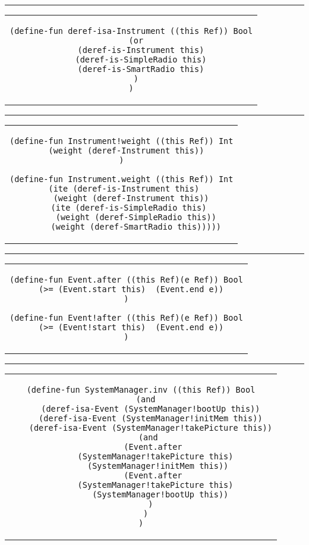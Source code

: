 \rule{\textwidth}{0.2pt}

\begin{center}
\begin{tabular}{c}
\begin{lstlisting}
(define-fun deref-isa-Instrument ((this Ref)) Bool
  (or
    (deref-is-Instrument this)
    (deref-is-SimpleRadio this)
    (deref-is-SmartRadio this)
  )
)
\end{lstlisting}
\end{tabular}
\end{center}

\rule{\textwidth}{0.2pt}

\begin{center}
\begin{tabular}{c}
\begin{lstlisting}
(define-fun Instrument!weight ((this Ref)) Int
  (weight (deref-Instrument this))
)

(define-fun Instrument.weight ((this Ref)) Int
  (ite (deref-is-Instrument this) 
    (weight (deref-Instrument this))
    (ite (deref-is-SimpleRadio this) 
      (weight (deref-SimpleRadio this))
      (weight (deref-SmartRadio this)))))
\end{lstlisting}
\end{tabular}
\end{center}

\rule{\textwidth}{0.2pt}

\begin{center}
\begin{tabular}{c}
\begin{lstlisting}
(define-fun Event.after ((this Ref)(e Ref)) Bool
  (>= (Event.start this)  (Event.end e))
)

(define-fun Event!after ((this Ref)(e Ref)) Bool
  (>= (Event!start this)  (Event.end e))
)
\end{lstlisting}
\end{tabular}
\end{center}

\rule{\textwidth}{0.2pt}

\begin{center}
\begin{tabular}{c}
\begin{lstlisting}
(define-fun SystemManager.inv ((this Ref)) Bool
  (and
    (deref-isa-Event (SystemManager!bootUp this))
    (deref-isa-Event (SystemManager!initMem this))
    (deref-isa-Event (SystemManager!takePicture this))
    (and 
      (Event.after 
        (SystemManager!takePicture this)  
        (SystemManager!initMem this)) 
      (Event.after 
        (SystemManager!takePicture this)  
        (SystemManager!bootUp this))
    )
  )
)
\end{lstlisting}
\end{tabular}
\end{center}

